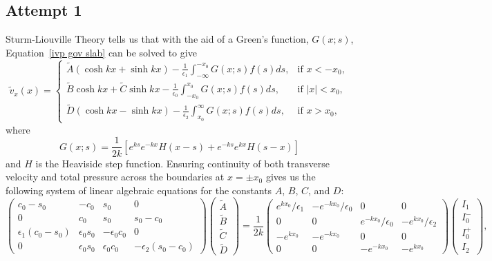 \documentclass{aastex61}
\begin{document}
\subsection{Attempt 1}
Sturm-Liouville Theory tells us that with the aid of a Green's function, $G(x;s)$, Equation~\eqref{ivp gov slab} can be solved to give
\begin{equation}
\tilde{v}_x(x) =
\begin{cases}
\tilde{A}(\cosh{kx} + \sinh{kx}) - \frac{1}{\epsilon_1} \int_{-\infty}^{-x_0} G(x;s)f(s)ds, & \text{if  } x<-x_0,\\
\tilde{B}\cosh{kx} + \tilde{C}\sinh{kx} - \frac{1}{\epsilon_0} \int_{-x_0}^{x_0} G(x;s)f(s)ds, & \text{if  } |x|<x_0,\\
\tilde{D}(\cosh{kx} - \sinh{kx}) - \frac{1}{\epsilon_2} \int_{x_0}^{\infty} G(x;s)f(s)ds, & \text{if  } x>x_0,
\end{cases}
\label{ivp slab sol}
\end{equation}
where
\begin{equation}
G(x;s) = \frac{1}{2k}[e^{ks}e^{-kx}H(x-s) + e^{-ks}e^{kx}H(s-x)]
\end{equation}
and $H$ is the Heaviside step function. Ensuring continuity of both transverse velocity and total pressure across the boundaries at $x=\pm x_0$ gives us the following system of linear algebraic equations for the constants $A$, $B$, $C$, and $D$:
\begin{equation}
\left(
\begin{matrix}
c_0-s_0              &-c_0           &s_0              &0                   \\
0                    &c_0            &s_0              &s_0-c_0           \\
\epsilon_1(c_0-s_0)  &\epsilon_0s_0  &-\epsilon_0c_0   &0                   \\
0                    &\epsilon_0s_0  &\epsilon_0c_0    &-\epsilon_2(s_0-c_0)
\end{matrix}
\right)
\left(
\begin{matrix}
\tilde{A} \\
\tilde{B} \\
\tilde{C} \\
\tilde{D}
\end{matrix}
\right)
=
\frac{1}{2k}
\left(
\begin{matrix}
e^{kx_0}/\epsilon_1  & -e^{-kx_0}/\epsilon_0  & 0                      & 0                   \\
0                    & 0                      & e^{-kx_0}/\epsilon_0   & -e^{kx_0}/\epsilon_2 \\
-e^{kx_0} & -e^{-kx_0}  & 0                      & 0                   \\
0                    & 0                      & -e^{-kx_0}  & -e^{kx_0}
\end{matrix}
\right)
\left(
\begin{matrix}
I_1    \\
I_0^- \\
I_0^+ \\
I_2
\end{matrix}
\right),
\label{coefmatrix}
\end{equation}
\end{document}
